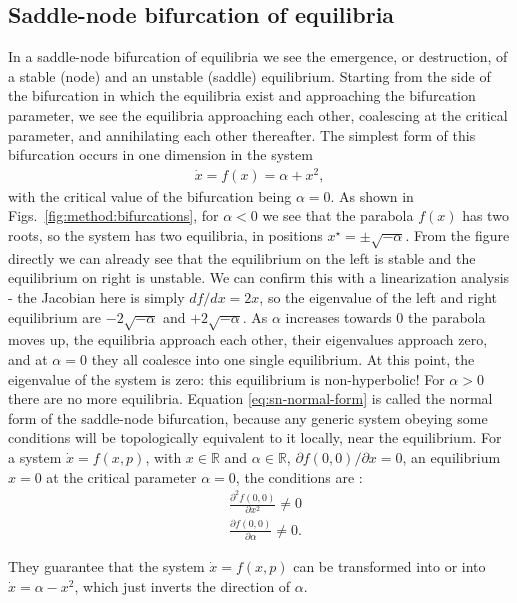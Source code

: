 \subsection{Saddle-node bifurcation of equilibria}
In a saddle-node bifurcation of equilibria we see the emergence, or destruction, of a stable (node) and an unstable (saddle) equilibrium. Starting from the side of the bifurcation in which the equilibria exist and approaching the bifurcation parameter, we see the equilibria approaching each other, coalescing at the critical parameter, and annihilating each other thereafter. The simplest form of this bifurcation occurs in one dimension in the system 
%
\begin{align}
    \dot{x} = f(x) = \alpha + x^2,
    \label{eq:sn-normal-form}
\end{align}
with the critical value of the bifurcation being $\alpha = 0$. As shown in Figs.~\ref{fig:method:bifurcations}, for $\alpha < 0$ we see that the parabola $f(x)$ has two roots, so the system has two equilibria, in positions $x^\star = \pm \sqrt{-\alpha}$. From the figure directly we can already see that the equilibrium on the left is stable and the equilibrium on right is unstable. We can confirm this with a linearization analysis - the Jacobian here is simply $df/dx = 2x$, so the eigenvalue of the left and right equilibrium are $-2\sqrt{-\alpha}$ and $+2\sqrt{-\alpha}$.   As $\alpha$ increases towards $0$ the parabola moves up, the equilibria approach each other, their eigenvalues approach zero, and at $\alpha=0$ they all coalesce into one single equilibrium. At this point, the eigenvalue of the system is zero: this equilibrium is non-hyperbolic! For $\alpha > 0$ there are no more equilibria. Equation \ref{eq:sn-normal-form} is called the normal form of the saddle-node bifurcation, because any generic system obeying some conditions will be topologically equivalent to it locally, near the equilibrium. For a system $\dot{x} = f(x,p)$, with $x \in \mathbb{R}$ and $\alpha \in \mathbb{R}$, $\partial f(0,0) / \partial x = 0$, an equilibrium $x = 0$ at the critical parameter $\alpha = 0$, the conditions are \cite{kuznetsov}:
%
\begin{align}
    &\frac{\partial^2 f(0, 0)}{\partial x^2} \neq 0 \\ 
    &\frac{\partial f(0, 0)}{\partial \alpha} \neq 0.
\end{align}

They guarantee that the system $\dot{x} = f(x,p)$ can be transformed into  or into $\dot{x} = \alpha - x^2$, which just inverts the direction of $\alpha$. 

